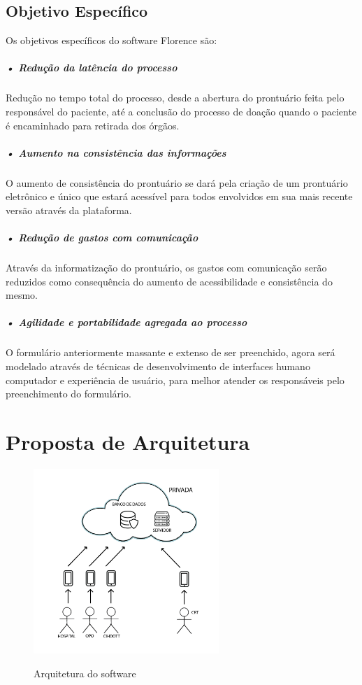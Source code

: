 \documentclass[portuguese,oneside]{tcc}
\begin{document}
\subsection{Objetivo Específico}
Os objetivos específicos do software Florence são:

\subparagraph{• Redução da latência do processo}

Redução no tempo total do processo, desde a abertura do prontuário feita pelo responsável do paciente, até a conclusão do processo de doação quando o paciente é encaminhado para retirada dos órgãos.

\subparagraph{• Aumento na consistência das informações}

O aumento de consistência do prontuário se dará pela criação de um prontuário eletrônico e único que estará acessível para todos envolvidos em sua mais recente versão através da plataforma.

\subparagraph{• Redução de gastos com comunicação}

Através da informatização do prontuário, os gastos com comunicação serão reduzidos como consequência do aumento de acessibilidade e consistência do mesmo.

\subparagraph{• Agilidade e portabilidade agregada ao processo}

O formulário anteriormente massante e extenso de ser preenchido, agora será modelado através de técnicas de desenvolvimento de interfaces humano computador e experiência de usuário, para melhor atender os responsáveis pelo preenchimento do formulário.

\section{Proposta de Arquitetura}

\begin{figure}[htp]
\centering
\caption{Arquitetura do software}
\includegraphics[width=7cm]{cliente-servidor}
\label{fig:cliente-servidor}
\end{figure}
\end{document}
